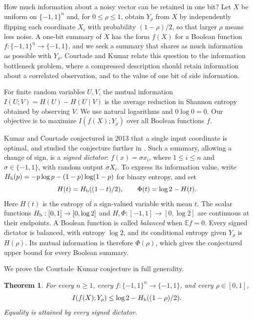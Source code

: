 \documentclass[11pt,letterpaper]{amsart}
\newcommand{\E}{\mathbb E}
\newcommand{\1}{\mathbf 1}
\newtheorem{theorem}{Theorem}[section]
\numberwithin{equation}{section}
\begin{document}
How much information about a noisy vector can be retained in one bit?
Let $X$ be uniform on $\{-1,1\}^n$ and, for $0\le\rho\le1$, obtain
$Y_\rho$ from $X$ by independently flipping each coordinate $X_i$ with probability
$(1-\rho)/2$, so that larger $\rho$ means less noise. A one-bit
summary of $X$ has the form $f(X)$ for a Boolean function
$f:\{-1,1\}^n\to\{-1,1\}$, and we seek a summary that shares as
much information as possible with $Y_\rho$. Courtade and Kumar
\cite{CourtadeKumar2014} relate this question to the information
bottleneck problem, where a compressed description should retain
information about a correlated observation, and to the value of one
bit of side information.

For finite random variables $U,V$, the mutual information
$I(U;V)=H(U)-H(U\mid V)$ is the average reduction in Shannon
entropy obtained by observing $V$. We use natural logarithms and
$0\log0=0$. Our objective is to maximize $I(f(X);Y_\rho)$
over all Boolean functions $f$.

Kumar and Courtade conjectured in 2013 \cite{KumarCourtade2013}
that a single input coordinate is optimal, and studied the conjecture
further in \cite{CourtadeKumar2014}. Such a summary, allowing a change
of sign, is a \emph{signed dictator}: $f(x)=\sigma x_i$, where
$1\le i\le n$ and $\sigma\in\{-1,1\}$, with random output $\sigma X_i$.
To express its information value, write
$H_{\rm b}(p)=-p\log p-(1-p)\log(1-p)$ for binary entropy, and set
\begin{equation}\label{eq:entropy-functions}
 H(t)=H_{\rm b}((1-t)/2),\qquad \Phi(t)=\log2-H(t).
\end{equation}
Here $H(t)$ is the entropy of a sign-valued variable with mean $t$.
The scalar functions $H_{\rm b}:[0,1]\to[0,\log2]$ and
$H,\Phi:[-1,1]\to[0,\log2]$ are continuous at their endpoints.
A Boolean function is
called \emph{balanced} when $\E f=0$. Every signed dictator is
balanced, with entropy $\log2$, and its conditional entropy given
$Y_\rho$ is $H(\rho)$. Its mutual information is therefore
$\Phi(\rho)$, which gives the conjectured upper bound for every Boolean summary.



We prove the Courtade--Kumar conjecture in full generality.

\begin{theorem}\label{jp:main}
For every $n\ge1$, every $f:\{-1,1\}^n\to\{-1,1\}$, and every
$\rho\in[0,1]$,
\[
 I(f(X);Y_\rho)\le\log2-H_{\rm b}((1-\rho)/2).
\]
Equality is attained by every signed dictator.
\end{theorem}
\end{document}
